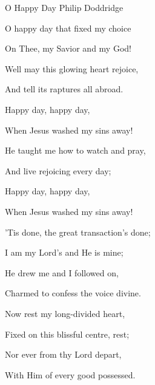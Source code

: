\documentclass[12pt]{book}
\begin{document}
\begin{song}{O Happy Day}{}
  {\SBPubDom}
  {Philip Doddridge}
  {}
  {}

  \begin{SBVerse}
    O happy day that fixed my choice

    On Thee, my Savior and my God!

    Well may this glowing heart rejoice,

    And tell its raptures all abroad.
  \end{SBVerse}

  \begin{SBOpGroup}
    Happy day, happy day,

    When Jesus washed my sins away!

    He taught me how to watch and pray,

    And live rejoicing every day;

    Happy day, happy day,

    When Jesus washed my sins away!
  \end{SBOpGroup}

  \begin{SBVerse}
    'Tis done, the great transaction's done;

    I am my Lord's and He is mine;

    He drew me and I followed on,

    Charmed to confess the voice divine.
  \end{SBVerse}

  \begin{SBVerse}
    Now rest my long-divided heart,

    Fixed on this blissful centre, rest;

    Nor ever from thy Lord depart,

    With Him of every good possessed.
  \end{SBVerse}
\end{song}
\end{document}
